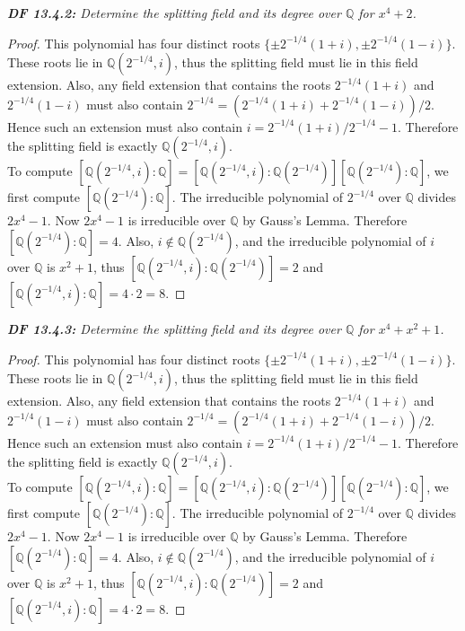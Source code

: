 \documentclass{article}
\begin{document}
\it \textbf{DF 13.4.2:} Determine the splitting field and its degree over
  $\mathbb{Q}$ for $x^4+2$.

  \begin{proof}
    This polynomial has four distinct roots $\{\pm2^{-1/4}(1+i),
    \pm2^{-1/4}(1-i)\}$. These roots lie in $\mathbb{Q}(2^{-1/4},i)$, thus
    the splitting field must lie in this field extension. Also, any field
    extension that contains the roots $2^{-1/4}(1+i)$ and $2^{-1/4}(1-i)$
    must also contain $2^{-1/4}=(2^{-1/4}(1+i) +2^{-1/4}(1-i))/2$. Hence
    such an extension must also contain $i=2^{-1/4}(1+i)/2^{-1/4}-1$.
    Therefore the splitting field is exactly $\mathbb{Q}(2^{-1/4},i)$. \\

    To compute $[\mathbb{Q}(2^{-1/4},i):\mathbb{Q}]
    =[\mathbb{Q}(2^{-1/4},i):\mathbb{Q}(2^{-1/4})]
    [\mathbb{Q}(2^{-1/4}):\mathbb{Q}]$, we first compute
    $[\mathbb{Q}(2^{-1/4}):\mathbb{Q}]$. The irreducible
    polynomial of $2^{-1/4}$ over $\mathbb{Q}$ divides $2x^4-1$. Now
    $2x^4-1$ is irreducible over $\mathbb{Q}$ by Gauss's Lemma. Therefore
    $[\mathbb{Q}(2^{-1/4}):\mathbb{Q}]=4$. Also,
    $i\not\in\mathbb{Q}(2^{-1/4})$, and the irreducible polynomial of
    $i$ over $\mathbb{Q}$ is $x^2+1$, thus
    $[\mathbb{Q}(2^{-1/4},i):\mathbb{Q}(2^{-1/4})]=2$ and
    $[\mathbb{Q}(2^{-1/4},i):\mathbb{Q}]=4\cdot2=8$.
  \end{proof}

\it \textbf{DF 13.4.3:} Determine the splitting field and its degree over
  $\mathbb{Q}$ for $x^4+x^2+1$.

  \begin{proof}
    This polynomial has four distinct roots $\{\pm2^{-1/4}(1+i),
    \pm2^{-1/4}(1-i)\}$. These roots lie in $\mathbb{Q}(2^{-1/4},i)$, thus
    the splitting field must lie in this field extension. Also, any field
    extension that contains the roots $2^{-1/4}(1+i)$ and $2^{-1/4}(1-i)$
    must also contain $2^{-1/4}=(2^{-1/4}(1+i) +2^{-1/4}(1-i))/2$. Hence
    such an extension must also contain $i=2^{-1/4}(1+i)/2^{-1/4}-1$.
    Therefore the splitting field is exactly $\mathbb{Q}(2^{-1/4},i)$. \\

    To compute $[\mathbb{Q}(2^{-1/4},i):\mathbb{Q}]
    =[\mathbb{Q}(2^{-1/4},i):\mathbb{Q}(2^{-1/4})]
    [\mathbb{Q}(2^{-1/4}):\mathbb{Q}]$, we first compute
    $[\mathbb{Q}(2^{-1/4}):\mathbb{Q}]$. The irreducible
    polynomial of $2^{-1/4}$ over $\mathbb{Q}$ divides $2x^4-1$. Now
    $2x^4-1$ is irreducible over $\mathbb{Q}$ by Gauss's Lemma. Therefore
    $[\mathbb{Q}(2^{-1/4}):\mathbb{Q}]=4$. Also,
    $i\not\in\mathbb{Q}(2^{-1/4})$, and the irreducible polynomial of
    $i$ over $\mathbb{Q}$ is $x^2+1$, thus
    $[\mathbb{Q}(2^{-1/4},i):\mathbb{Q}(2^{-1/4})]=2$ and
    $[\mathbb{Q}(2^{-1/4},i):\mathbb{Q}]=4\cdot2=8$.
  \end{proof}
\end{document}
